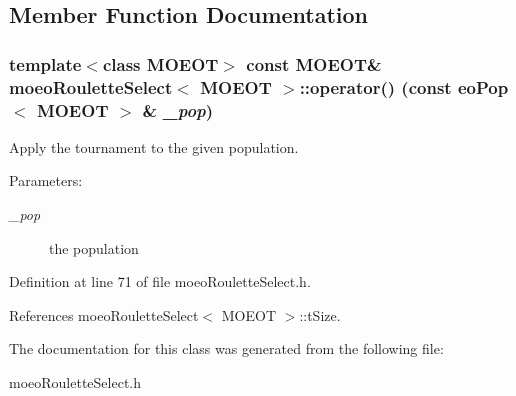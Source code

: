 \subsection{Member Function Documentation}
\subsubsection{\setlength{\rightskip}{0pt plus 5cm}template$<$class MOEOT$>$ const MOEOT\& \bf{moeo\-Roulette\-Select}$<$ MOEOT $>$::operator() (const \bf{eo\-Pop}$<$ MOEOT $>$ \& {\em \_\-pop})\hspace{0.3cm}{\tt  [inline]}}\label{classmoeoRouletteSelect_573fe156daf6fdfbae96d2b54a9fc260}


Apply the tournament to the given population. 

\begin{Desc}
\item[Parameters:]
\begin{description}
\item[{\em \_\-pop}]the population \end{description}
\end{Desc}


Definition at line 71 of file moeo\-Roulette\-Select.h.

References moeo\-Roulette\-Select$<$ MOEOT $>$::t\-Size.

The documentation for this class was generated from the following file:\begin{CompactItemize}
\item 
moeo\-Roulette\-Select.h\end{CompactItemize}
